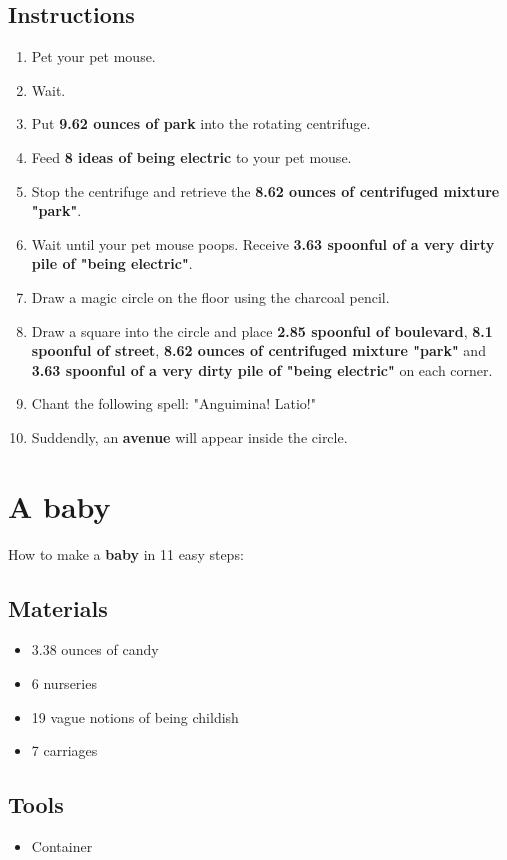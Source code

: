 \documentclass{article}
\begin{document}
\subsection{Instructions}\begin{enumerate}
\item 
Pet your pet mouse.
\item 
Wait.
\item 
Put \textbf{9.62 ounces of park} into the rotating centrifuge.
\item 
Feed \textbf{8 ideas of being electric} to your pet mouse.
\item 
Stop the centrifuge and retrieve the \textbf{8.62 ounces of centrifuged mixture "park"}.
\item 
Wait until your pet mouse poops. Receive \textbf{3.63 spoonful of a very dirty pile of "being electric"}.
\item 
Draw a magic circle on the floor using the charcoal pencil.
\item 
Draw a square into the circle and place \textbf{2.85 spoonful of boulevard}, \textbf{8.1 spoonful of street}, \textbf{8.62 ounces of centrifuged mixture "park"} and \textbf{3.63 spoonful of a very dirty pile of "being electric"} on each corner.
\item 
Chant the following spell: "Anguimina! Latio!"
\item 
Suddendly, an \textbf{avenue} will appear inside the circle.
\end{enumerate}
\newpage
\section{A baby}How to make a \textbf{baby} in 11 easy steps:

\subsection{Materials}\begin{itemize}
\item 
3.38 ounces of candy
\item 
6 nurseries
\item 
19 vague notions of being childish
\item 
7 carriages
\end{itemize}
\subsection{Tools}\begin{itemize}
\item 
Container
\end{itemize}
\end{document}
